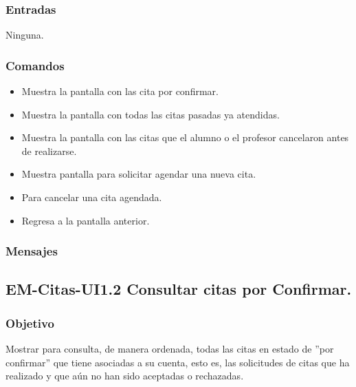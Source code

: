 \subsubsection{Entradas}
	\noindent
	Ninguna.

\subsubsection{Comandos}
	\begin{itemize}
		\item {} Muestra la pantalla con las cita por confirmar.
		\item {} Muestra la pantalla con todas las citas pasadas ya atendidas.
		\item {} Muestra la pantalla con las citas que el alumno o el profesor cancelaron antes de realizarse.
		\item \IUbutton{ + } Muestra pantalla para solicitar agendar una nueva cita.
		\item {} Para cancelar una cita agendada.
		\item {} Regresa a la pantalla anterior.
	\end{itemize}

\subsubsection{Mensajes}
	\noindent

\pagebreak

\subsection{EM-Citas-UI1.2 Consultar citas por Confirmar.}

\subsubsection{Objetivo}
	\noindent
	Mostrar para consulta, de manera ordenada, todas las citas en estado de ''por confirmar'' que tiene asociadas a su cuenta, esto es, las solicitudes de citas que ha realizado y que aún no han sido aceptadas o rechazadas. 

